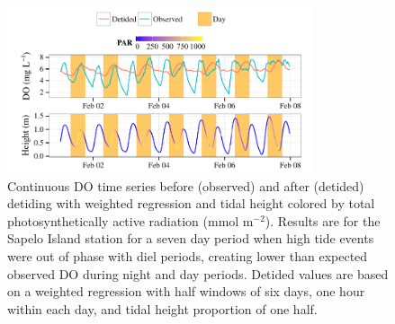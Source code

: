 \documentclass[letterpaper,12pt,oneside]{article}\usepackage[]{graphicx}\usepackage[]{color}
\newenvironment{knitrout}{}{} %
\begin{document}
\centering\vspace*{\fill}
\begin{knitrout}
\color{fgcolor}\begin{figure}[!ht]


{\centering \includegraphics[width=0.8\textwidth]{figure/phase_out} 

}

\caption[Continuous \ac{DO} time series before (observed) and after (detided) detiding with weighted regression and tidal height colored by total photosynthetically active radiation (mmol m$^{-2}$)]{Continuous \ac{DO} time series before (observed) and after (detided) detiding with weighted regression and tidal height colored by total photosynthetically active radiation (mmol m$^{-2}$). Results are for the Sapelo Island station for a seven day period when high tide events were out of phase with diel periods, creating lower than expected observed \ac{DO} during night and day periods. Detided values are based on a weighted regression with half windows of six days, one hour within each day, and tidal height proportion of one half.\label{fig:phase_out}}
\end{figure}


\end{knitrout}
\vfill
\clearpage
\end{document}
